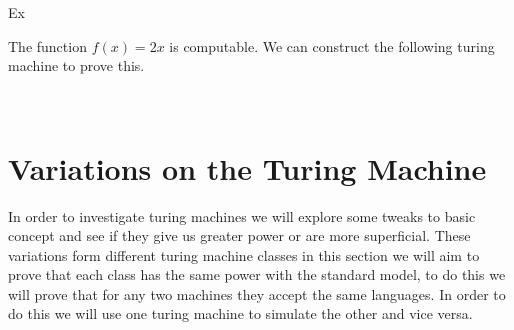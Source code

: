 \documentclass[11pt]{exam}
\begin{document}
Ex
\begin{center}
The function  $f(x) = 2x$ is computable.  We can construct the following turing machine to prove this.\\ 
\\
\end{center}

\newpage

\section{Variations on the Turing Machine}
In order to investigate turing machines we will explore some tweaks to basic concept and see if they give us greater power or are more superficial. These variations form different turing machine classes
in this section we will aim to prove that each class has the same power with the standard model,
to do this we will prove that for any two machines they accept the same languages. In order to do
this we will use one turing machine to simulate the other and vice versa.
\end{document}
